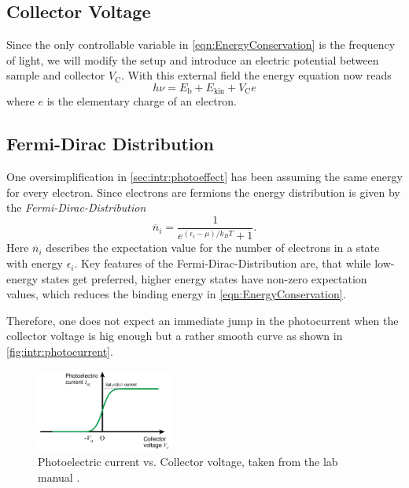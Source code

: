 \subsection{Collector Voltage}
\label{sec:intr:colletor_voltage}
Since the only controllable variable in \autoref{eqn:EnergyConservation} is the frequency of light,
we will modify the setup and introduce an electric potential between sample and collector
$V_\text{C}$.
With this external field the energy equation now reads
\begin{equation}
  h\nu = E_\text{b} + E_\text{kin} + V_\text{C} e
  \label{eqn:energy_modified}
\end{equation}
where $e$ is the elementary charge of an electron.

\subsection{Fermi-Dirac Distribution}
\label{sec:intr:fermi-dirac}
One oversimplification in \autoref{sec:intr:photoeffect} has been assuming the same energy for every
electron. Since electrons are fermions the energy distribution is given by the
\textit{Fermi-Dirac-Distribution}
\begin{equation}
  \overline{n}_i = \frac{1}{e^{(\epsilon_i - \mu) / k_BT} + 1}.
\end{equation}
Here $\overline{n}_i$ describes the expectation value for the number of electrons in a state with
energy $\epsilon_i$. Key features of the Fermi-Dirac-Distribution are, that while low-energy states
get preferred, higher energy states have non-zero expectation values, which reduces the binding
energy in \autoref{eqn:EnergyConservation}. 

Therefore, one does not expect an immediate jump in the photocurrent when the collector voltage is
hig enough but a rather smooth curve as shown in \autoref{fig:intr:photocurrent}.

\begin{figure}
    \centering
    \includegraphics[width=0.4\textwidth]{media/photocurrent.png}
    \caption{Photoelectric current vs. Collector voltage, taken from the lab manual \cite{LabInstructions}.}
    \label{fig:intr:photocurrent}
\end{figure}
